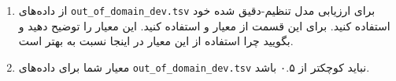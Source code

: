 \begin{enumerate}
	
	
	
	
	\item 
از داده‌های \texttt{out\_of\_domain\_dev.tsv} برای ارزیابی مدل تنظیم-دقیق شده خود استفاده کنید. برای این قسمت از معیار  و  استفاده کنید. این معیار را توضیح دهید و بگویید چرا استفاده از این معیار در اینجا نسبت به  بهتر است.
	\begin{qsolve}
		
	\end{qsolve}
	
	
	
	
	
	
	\item 
معیار  شما برای داده‌های \texttt{out\_of\_domain\_dev.tsv} نباید کوچکتر از ۰.۵ باشد.


	
\end{enumerate}